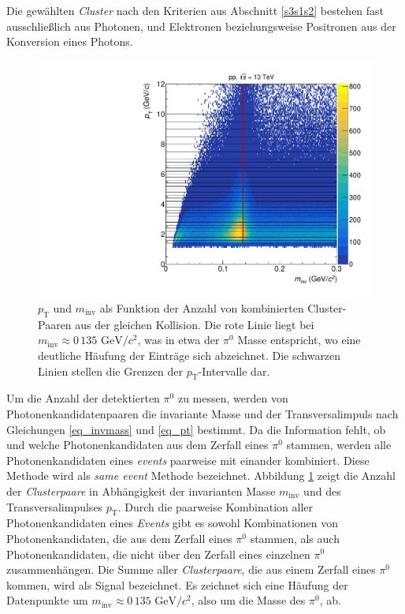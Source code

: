 Die gewählten \textit{Cluster} nach den Kriterien aus Abschnitt \ref{s3s1s2} bestehen fast ausschließlich aus Photonen, und  Elektronen beziehungsweise Positronen aus der Konversion eines Photons.
\begin{figure}[t!]
\centering
\includegraphics[width=.7\linewidth]{hInvMass_pT_Signal.pdf}
\caption{$p_\text{T}$ und $m_\text{inv}$ als Funktion der Anzahl von kombinierten  Cluster-Paaren aus der gleichen Kollision.
Die rote Linie liegt bei $m_{\text{inv}}\approx0\,135\text{ GeV/}c^{2}$, was in etwa der $\pi^{0}$ Masse entspricht, wo eine deutliche Häufung der Einträge sich abzeichnet.
Die schwarzen Linien stellen die Grenzen der $p_{\text{T}}$-Intervalle dar.}
\label{figInvMassPt_a}
\end{figure}
\newline
Um die Anzahl der detektierten $\pi^{0}$ zu messen, werden von Photonenkandidatenpaaren die invariante Masse und der Transversalimpuls nach Gleichungen \ref{eq_invmass} und \ref{eq_pt} bestimmt.
Da die Information fehlt, ob und welche Photonenkandidaten aus dem Zerfall eines $\pi^{0}$ stammen, werden alle Photonenkandidaten eines \textit{events} paarweise mit einander kombiniert.
Diese Methode wird als \textit{same event} Methode bezeichnet.
Abbildung \ref{figInvMassPt_a} zeigt die Anzahl der \textit{Clusterpaare} in Abhängigkeit der invarianten Masse $m_{\text{inv}}$ und des Transversalimpulses $p_{\text{T}}$.
Durch die paarweise Kombination aller Photonenkandidaten eines \textit{Events} gibt es sowohl Kombinationen von Photonenkandidaten, die aus dem Zerfall eines $\pi^{0}$ stammen, als auch Photonenkandidaten, die nicht über den Zerfall eines einzelnen $\pi^{0}$ zusammenhängen.
\newline
Die Summe aller \textit{Clusterpaare}, die aus einem Zerfall eines $\pi^{0}$ kommen, wird als Signal bezeichnet.
Es zeichnet sich eine Häufung der Datenpunkte um $m_{\text{inv}}\approx 0\,135\text{ GeV}/c^{2}$, also um die Masse des $\pi^{0}$, ab.
